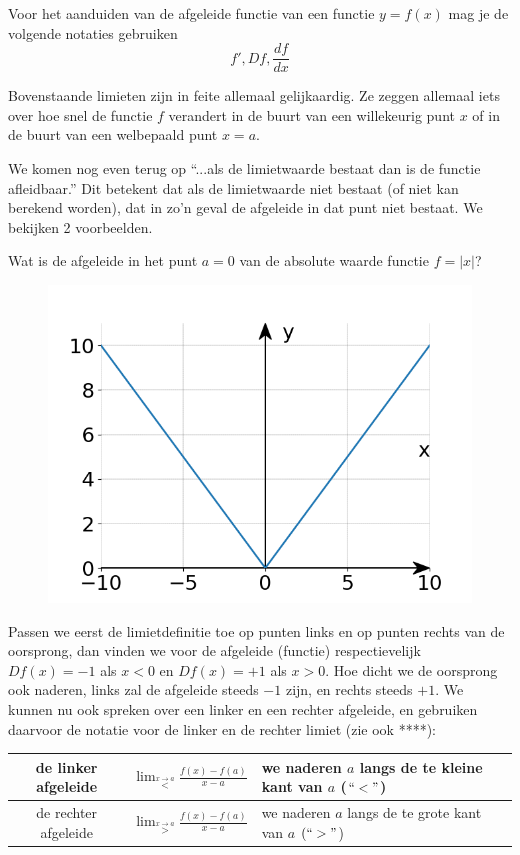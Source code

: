 \begin{notatie}
Voor het aanduiden van de afgeleide functie van een functie $y=f(x)$ mag je de volgende notaties gebruiken
\[f',Df,\frac{df}{dx}\]
\end{notatie}

Bovenstaande limieten zijn in feite allemaal gelijkaardig. Ze zeggen
allemaal iets over hoe snel de functie $f$ verandert in de buurt
van een willekeurig punt $x$ of in de buurt van een welbepaald punt
$x=a$.

\medskip{}


We komen nog even terug op ``...als de limietwaarde bestaat dan is
de functie afleidbaar.'' Dit betekent dat als de limietwaarde niet
bestaat (of niet kan berekend worden), dat in zo'n geval de afgeleide
in dat punt niet bestaat. We bekijken 2 voorbeelden.\medskip{}


\begin{voorbeeld}
	Wat is de afgeleide in het punt $a=0$ van de absolute
waarde functie $f=\left|x\right|$? 

	\begin{figure}[h]
	\begin{center}
		\includegraphics[height=5 cm]{6_afgeleiden_integralen/inputs/1_2_vb4}
	\end{center}
\end{figure}

Passen we eerst de limietdefinitie
toe op punten links en op punten rechts van de oorsprong, dan vinden
we voor de afgeleide (functie) respectievelijk $Df(x)=-1$ als $x<0$
en $Df(x)=+1$ als $x>0$. Hoe dicht we de oorsprong ook naderen,
links zal de afgeleide steeds $-1$ zijn, en rechts steeds $+1$.
We kunnen nu ook spreken over een linker en een rechter afgeleide,
en gebruiken daarvoor de notatie voor de linker en de rechter limiet
(zie ook {*}{*}{*}{*}):\medskip{}
\end{voorbeeld}


\begin{tabular}{|c|c|l|}
	\hline 
	\multirow{1}{*}{de linker afgeleide} & ${\displaystyle \lim_{\overset{x\rightarrow a}{<}}}\frac{f(x)-f(a)}{x-a}$ & we naderen $a$ langs de te kleine kant van $a$ ($\lyxmathsym{\textquotedblleft}<\lyxmathsym{\textquotedblright}$)\tabularnewline
	\hline 
	\multirow{1}{*}{de rechter afgeleide} & ${\displaystyle \lim_{\overset{x\rightarrow a}{>}}}\frac{f(x)-f(a)}{x-a}$ & we naderen $a$ langs de te grote kant van $a$ $(\lyxmathsym{\textquotedblleft}>\lyxmathsym{\textquotedblright}$)\tabularnewline
	\hline 
\end{tabular}

